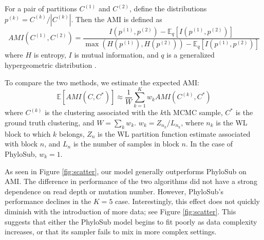 \documentclass{bioinfo}
\begin{document}
For a pair of partitions $C^{(1)}$ and $C^{(2)}$, define the distributions $p^{(k)} = C^{(k)}/|C^{(k)}|$.  Then the AMI is defined as
\begin{equation}
AMI(C^{(1)}, C^{(2)}) = \frac{I(p^{(1)}, p^{(2)}) - \mathbb{E}_q\left[I(p^{(1)}, p^{(2)})\right]  }{\max(H(p^{(1)}), H(p^{(2)})) - \mathbb{E}_q\left[I(p^{(1)}, p^{(2)})\right]}
\end{equation} 
where $H$ is entropy, $I$ is mutual information, and $q$ is a generalized hypergeometric distribution \cite{Vinh2009}.

To compare the two methods, we estimate the expected AMI:
\begin{equation}
\mathbb{E}\left[AMI(C, C^*)\right] \approx \frac{1}{W} \sum_{k=1}^K w_k AMI(C^{(k)}, C^*)
\end{equation}
where $C^{(k)}$ is the clustering associated with the $k$th MCMC sample, $C^*$ is the ground truth clustering, and $W=\sum_k w_k$.  $w_k = Z_{n_k}/L_{n_k}$, where $n_k$ is the WL block to which $k$ belongs, $Z_n$ is the WL partition function estimate associated with block $n$, and $L_n$ is the number of samples in block $n$.  In the case of PhyloSub, $w_k=1$.
 
As seen in Figure \ref{fig:scatter}, our model generally outperforms PhyloSub on AMI.  The difference in performance of the two algorithms did not have a strong dependence on read depth or mutation number.  However, PhyloSub's performance declines in the $K=5$ case.  Interestingly, this effect does not quickly diminish with the introduction of more data; see Figure \ref{fig:scatter}.  This suggests that either the PhyloSub model begins to fit poorly as data complexity increases, or that its sampler fails to mix in more complex settings.
\end{document}
